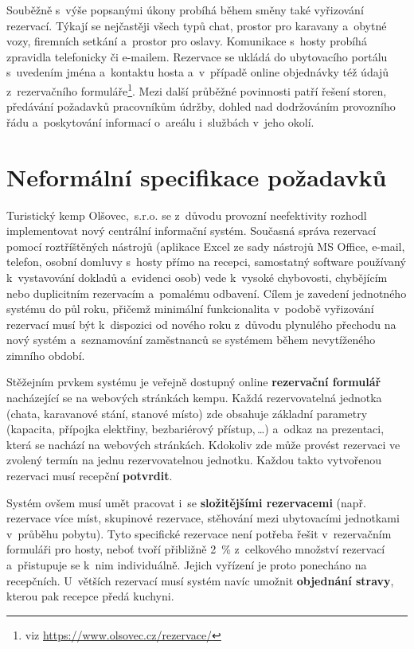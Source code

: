 Souběžně s~výše popsanými úkony probíhá během směny také vyřizování rezervací.
Týkají se nejčastěji všech typů chat, prostor pro karavany a~obytné vozy, firemních setkání a~prostor pro oslavy.
Komunikace s~hosty probíhá zpravidla telefonicky či e-mailem.
Rezervace se ukládá do ubytovacího portálu s~uvedením jména a~kontaktu hosta a~v~případě online objednávky též údajů z~rezervačního formuláře\footnote{viz \url{https://www.olsovec.cz/rezervace/}}.
Mezi další průběžné povinnosti patří řešení storen, předávání požadavků pracovníkům údržby, dohled nad dodržováním provozního řádu a~poskytování informací o~areálu i~službách v~jeho okolí.

\section{Neformální specifikace požadavků}
\label{sec:pozadavky}
Turistický kemp Olšovec,~s.r.o. se z~důvodu provozní neefektivity rozhodl implementovat nový centrální informační systém.
Současná správa rezervací pomocí roztříštěných nástrojů (aplikace Excel ze sady nástrojů MS Office, e-mail, telefon, osobní domluvy s~hosty přímo na recepci, samostatný software používaný k~vystavování dokladů a~evidenci osob) vede k~vysoké chybovosti, chybějícím nebo duplicitním rezervacím a~pomalému odbavení.
Cílem je zavedení jednotného systému do půl roku, přičemž minimální funkcionalita v~podobě vyřizování rezervací musí být k~dispozici od nového roku z~důvodu plynulého přechodu na nový systém a~seznamování zaměstnanců se systémem během nevytíženého zimního období.

Stěžejním prvkem systému je veřejně dostupný online \textbf{rezervační formulář} nacházející se na webových stránkách kempu.
Každá rezervovatelná jednotka (chata, karavanové stání, stanové místo) zde obsahuje základní parametry (kapacita, přípojka elektřiny, bezbariérový přístup,\,\ldots) a~odkaz na prezentaci, která se nachází na webových stránkách.
Kdokoliv zde může provést rezervaci ve zvolený termín na jednu rezervovatelnou jednotku.
Každou takto vytvořenou rezervaci musí recepční \textbf{potvrdit}.

Systém ovšem musí umět pracovat i~se \textbf{složitějšími rezervacemi} (např. rezervace více míst, skupinové rezervace, stěhování mezi ubytovacími jednotkami v~průběhu pobytu).
Tyto specifické rezervace není potřeba řešit v~rezervačním formuláři pro hosty, neboť tvoří přibližně 2~\% z~celkového množství rezervací a~přistupuje se k~nim individuálně.
Jejich vyřízení je proto ponecháno na recepčních.
U~větších rezervací musí systém navíc umožnit \textbf{objednání stravy}, kterou pak recepce předá kuchyni.


